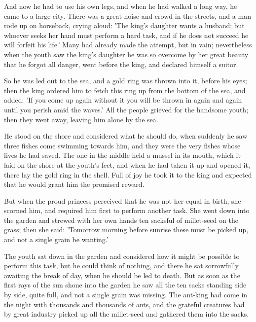 \documentclass[12pt]{book}
\begin{document}
And now he had to use his own legs, and when he had walked a long way,
he came to a large city. There was a great noise and crowd in the
streets, and a man rode up on horseback, crying aloud: 'The king's
daughter wants a husband; but whoever seeks her hand must perform a
hard task, and if he does not succeed he will forfeit his life.' Many
had already made the attempt, but in vain; nevertheless when the youth
saw the king's daughter he was so overcome by her great beauty that he
forgot all danger, went before the king, and declared himself a
suitor.

So he was led out to the sea, and a gold ring was thrown into it,
before his eyes; then the king ordered him to fetch this ring up from
the bottom of the sea, and added: 'If you come up again without it you
will be thrown in again and again until you perish amid the waves.'
All the people grieved for the handsome youth; then they went away,
leaving him alone by the sea.

He stood on the shore and considered what he should do, when suddenly
he saw three fishes come swimming towards him, and they were the very
fishes whose lives he had saved. The one in the middle held a mussel
in its mouth, which it laid on the shore at the youth's feet, and when
he had taken it up and opened it, there lay the gold ring in the
shell. Full of joy he took it to the king and expected that he would
grant him the promised reward.

But when the proud princess perceived that he was not her equal in
birth, she scorned him, and required him first to perform another
task. She went down into the garden and strewed with her own hands ten
sacksful of millet-seed on the grass; then she said: 'Tomorrow morning
before sunrise these must be picked up, and not a single grain be
wanting.'

The youth sat down in the garden and considered how it might be
possible to perform this task, but he could think of nothing, and
there he sat sorrowfully awaiting the break of day, when he should be
led to death. But as soon as the first rays of the sun shone into the
garden he saw all the ten sacks standing side by side, quite full, and
not a single grain was missing. The ant-king had come in the night
with thousands and thousands of ants, and the grateful creatures had
by great industry picked up all the millet-seed and gathered them into
the sacks.
\end{document}
